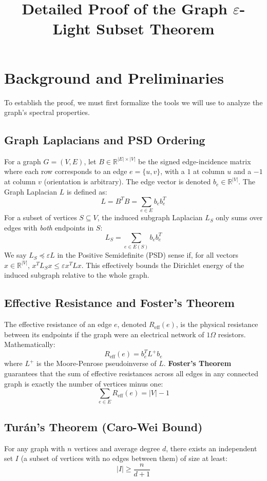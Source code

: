 \documentclass[12pt]{article}
\title{Detailed Proof of the Graph $\varepsilon$-Light Subset Theorem}
\author{}
\date{}
\begin{document}
\maketitle

\section{Background and Preliminaries}

To establish the proof, we must first formalize the tools we will use to analyze the graph's spectral properties.

\subsection{Graph Laplacians and PSD Ordering}
For a graph $G = (V,E)$, let $B \in \mathbb{R}^{|E| \times |V|}$ be the signed edge-incidence matrix where each row corresponds to an edge $e = \{u,v\}$, with a $1$ at column $u$ and a $-1$ at column $v$ (orientation is arbitrary). The edge vector is denoted $b_e \in \mathbb{R}^{|V|}$. 
The Graph Laplacian $L$ is defined as:
\[
L = B^T B = \sum_{e \in E} b_e b_e^T
\]
For a subset of vertices $S \subseteq V$, the induced subgraph Laplacian $L_S$ only sums over edges with \emph{both} endpoints in $S$:
\[
L_S = \sum_{e \in E(S)} b_e b_e^T
\]
We say $L_S \preceq \varepsilon L$ in the Positive Semidefinite (PSD) sense if, for all vectors $x \in \mathbb{R}^{|V|}$, $x^T L_S x \le \varepsilon x^T L x$. This effectively bounds the Dirichlet energy of the induced subgraph relative to the whole graph.

\subsection{Effective Resistance and Foster's Theorem}
The effective resistance of an edge $e$, denoted $R_{\text{eff}}(e)$, is the physical resistance between its endpoints if the graph were an electrical network of $1\Omega$ resistors. Mathematically:
\[
R_{\text{eff}}(e) = b_e^T L^+ b_e
\]
where $L^+$ is the Moore-Penrose pseudoinverse of $L$. \textbf{Foster's Theorem} guarantees that the sum of effective resistances across all edges in any connected graph is exactly the number of vertices minus one:
\[
\sum_{e \in E} R_{\text{eff}}(e) = |V| - 1
\]

\subsection{Tur\'an's Theorem (Caro-Wei Bound)}
For any graph with $n$ vertices and average degree $d$, there exists an independent set $I$ (a subset of vertices with no edges between them) of size at least:
\[
|I| \ge \frac{n}{d + 1}
\]
\end{document}
